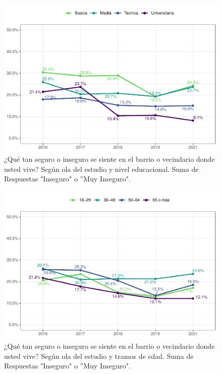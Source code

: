 \documentclass[
  12pt,
]{book}
\begin{document}
\begin{figure}

{\centering \includegraphics{reporte-elsoc_files/figure-latex/seguri-educ-1} 

}

\caption{¿Qué tan seguro o inseguro se siente en el barrio o vecindario donde usted vive? Según ola del estudio y nivel educacional. Suma de Respuestas "Inseguro" o ”Muy Inseguro".}\label{fig:seguri-educ}
\end{figure}

\begin{figure}

{\centering \includegraphics{reporte-elsoc_files/figure-latex/seguri-edad-1} 

}

\caption{¿Qué tan seguro o inseguro se siente en el barrio o vecindario donde usted vive? Según ola del estudio y tramos de edad. Suma de Respuestas "Inseguro" o ”Muy Inseguro".}\label{fig:seguri-edad}
\end{figure}
\end{document}

